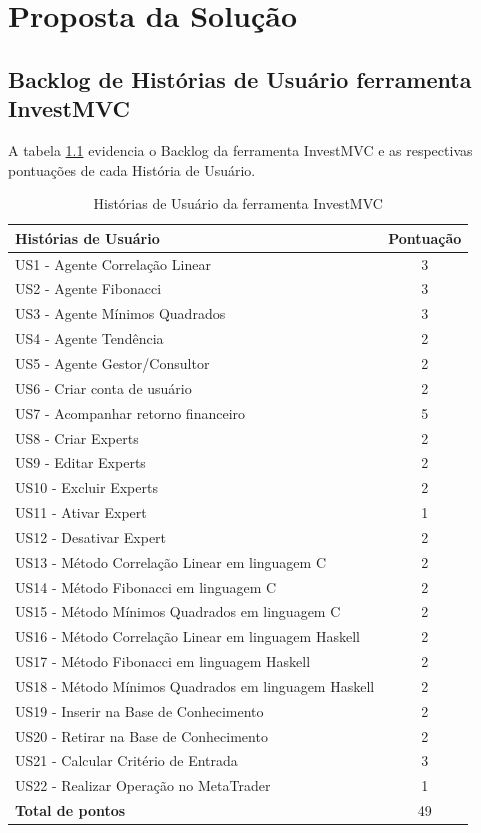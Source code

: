 \chapter{Proposta da Solução}

\section{Backlog de Histórias de Usuário ferramenta InvestMVC}

A tabela \ref{backlog} evidencia o Backlog da ferramenta InvestMVC e as respectivas pontuações de cada História de Usuário.

\begin{table}[H]
\caption{Histórias de Usuário da ferramenta InvestMVC}
\begin{center}
    \begin{tabular}{ | l | c |}
    \hline
    \textbf{Histórias de Usuário} & \textbf{Pontuação} \\ \hline

US1 - Agente Correlação Linear & 3\\ \hline
US2 - Agente Fibonacci & 3 \\ \hline
US3 - Agente Mínimos Quadrados & 3\\ \hline
US4 -  Agente Tendência & 2 \\ \hline
US5 - Agente Gestor/Consultor & 2\\ \hline
US6 - Criar conta de usuário & 2\\ \hline
US7 - Acompanhar retorno financeiro & 5\\ \hline
US8 - Criar Experts & 2\\ \hline
US9 - Editar Experts & 2\\ \hline
US10 - Excluir Experts & 2\\ \hline
US11 - Ativar Expert & 1\\ \hline
US12 - Desativar Expert & 2 \\ \hline
US13 - Método Correlação Linear em linguagem C & 2\\ \hline
US14 - Método Fibonacci em linguagem C & 2\\ \hline
US15 - Método Mínimos Quadrados em linguagem C & 2\\ \hline
US16 - Método Correlação Linear em linguagem Haskell & 2\\ \hline
US17 - Método Fibonacci em linguagem Haskell & 2\\ \hline
US18 - Método Mínimos Quadrados em linguagem Haskell & 2\\ \hline
US19 - Inserir na Base de Conhecimento & 2\\ \hline
US20 - Retirar na Base de Conhecimento & 2\\ \hline
US21 - Calcular Critério de Entrada & 3\\ \hline
US22 - Realizar Operação no MetaTrader& 1\\ \hline
\textbf{Total de pontos} & 49\\ \hline
\end{tabular}
\end{center}
\label{backlog}
\end{table}

